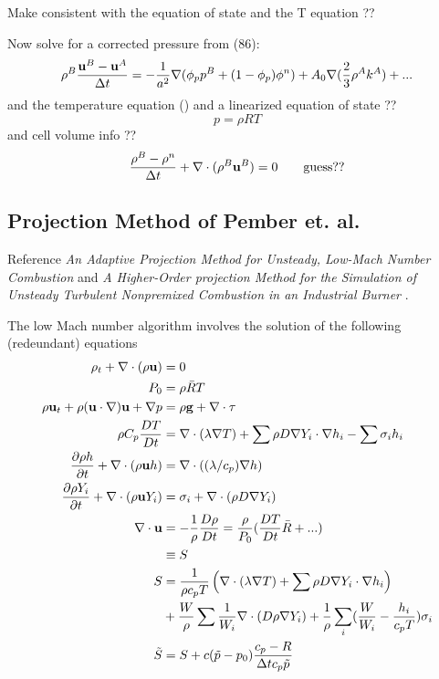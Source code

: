 \documentclass{article}
\begin{document}
Make consistent with the equation of state and the T equation ??

Now solve for a corrected pressure from
(86):
\[
 \rho^B { {\bf u}^B-{\bf u}^A \over {\Delta t}} = - {1\over a^2} \nabla( \phi_p p^B + (1-\phi_p)\phi^n )
          + A_0\nabla( {2\over 3} \rho^A k^A) +...
\]
and the temperature equation (\label{eq:kiva:te})
and a linearized equation of state ??
\[
   p = \rho R T
\]
and cell volume info ??
\[
  {\rho^B-\rho^n \over {\Delta t}} + \nabla\cdot( \rho^B {\bf u}^B ) =0   \qquad \mbox{guess??}
\]


\subsection{Projection Method of Pember et. al.}

Reference 
{\sl An Adaptive Projection Method for Unsteady, Low-Mach Number Combustion}
and
{\sl A Higher-Order projection Method for the Simulation of Unsteady Turbulent
Nonpremixed Combustion in an Industrial Burner} \cite{Pember??}.

The low Mach number algorithm involves the solution of the following (redeundant) equations 
\begin{align}
  \rho_t + \nabla\cdot( \rho{\bf u} ) &= 0 \\
   P_0 & = \rho \bar{R} T \\
   \rho {\bf u}_t + \rho ({\bf u}\cdot\nabla){\bf u} + \nabla p & = \rho{\bf g} + \nabla\cdot {\bf \tau}  \\
 \rho C_p {DT\over Dt} &= \nabla\cdot( \lambda \nabla T ) + 
       \sum \rho D \nabla Y_i\cdot\nabla h_i - \sum \sigma_i h_i \\
 {\partial \rho h \over \partial t} + \nabla\cdot( \rho {\bf u} h ) &= \nabla\cdot( (\lambda/c_p) \nabla h ) \\
 {\partial \rho Y_i \over \partial t} + \nabla\cdot(\rho{\bf u} Y_i) &= \sigma_i +\nabla\cdot(\rho D \nabla Y_i ) \\
   \nabla\cdot{\bf u} &= -{1\over\rho} {D\rho\over Dt} = {\rho \over P_0} ( {DT\over Dt} \bar{R} + ...) \\
          &\equiv S \\
 S &= {1\over \rho c_p T} \left( \nabla\cdot(\lambda\nabla T) + \sum \rho D\nabla Y_i\cdot\nabla h_i \right) \\
    & + {W\over \rho} \sum {1\over W_i}\nabla\cdot(D\rho\nabla Y_i) +
          {1\over \rho} \sum_i( {W\over W_i} - {h_i\over c_p T})\sigma_i \\
 \tilde{S} &= S + c (\tilde{p}-p_0) { c_p - R \over \Delta t c_p \tilde{p} }
\end{align}
\end{document}
